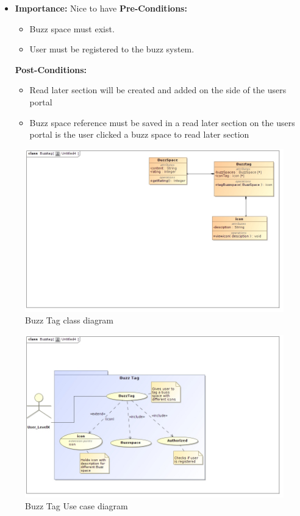 \documentclass[11pt]{article}
\begin{document}
\begin{enumerate}
\begin{itemize}
\item \textbf{Importance:}  Nice to have\newline
\textbf{Pre-Conditions: }
	\begin{itemize}
	\item Buzz space must exist.
	\item User must be registered to the buzz system.

	\end{itemize}

\textbf{Post-Conditions: }
	\begin{itemize}
	\item Read later section will be created and added on the side of the
users portal
	\item Buzz space reference must be saved in a read later section on the
users portal is the user clicked a buzz space to read later section
	
	\end{itemize}
\end{itemize}
\begin{figure}[H]	
\graphicspath{ {../Diagrams/sfiso/} }
    	\includegraphics[scale=0.5]{buzzC.jpg}
    	\caption{Buzz Tag class diagram}
	\end{figure}
	
	\begin{figure}[H]	
\graphicspath{ {../Diagrams/sfiso/} }
    	\includegraphics[scale=0.5]{tag.jpg}
    	\caption{Buzz Tag Use case diagram}
	\end{figure}



\end{enumerate}
\end{document}
